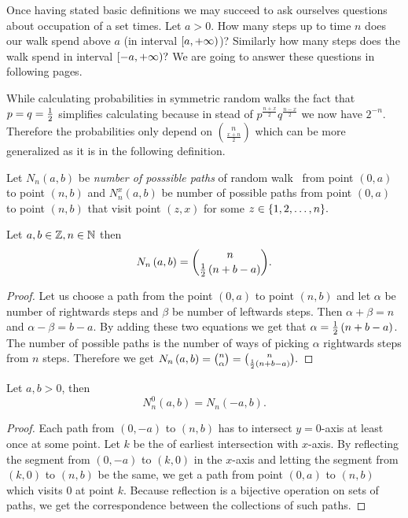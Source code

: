 \begin{rem}
  Once having stated basic definitions we may succeed to ask ourselves questions about occupation of a set times. Let $a>0$. How many steps up to time $n$ does our walk spend above $a$ (in interval $[a,{+\infty})$)? Similarly how many steps does the walk spend in interval $[-a,{+\infty})?$ We are going to answer these questions in following pages.
\end{rem}

\begin{rem}
 While calculating probabilities in symmetric random walks the fact that $p=q=\frac{1}{2}$ simplifies calculating because in stead of $p^{\frac{n+x}{2}}q^{\frac{n-x}{2}}$ we now have $2^{-n}.$ Therefore the probabilities only depend on $\binom{n}{\frac{x+n}{2}}$ which can be more generalized as it is in the following definition.
\end{rem}

\begin{defn}\label{defn-number_possible_paths}
 Let $N_n \left( a,b \right) $ be \emph{number of posssible paths} of random walk \rw\ from point $ \left( 0,a \right) $ to point $ \left( n,b \right)$
 and $N_n^x \left( a,b \right) $ be number of possible paths from point $ \left( 0,a \right) $ to point $\left( n,b \right)$
 that visit point $\left(z,x\right)$ for some $z \in \{1,2,\ldots, n\}.$
\end{defn}
\begin{thm}\label{thm-number_of_possible_paths}
 Let $a,b \in \mathbb{Z}, n \in \mathbb{N}$ then
 \[
    N_n \left( a,b \right) =\binom{n}{\frac{1}{2} \left(n+b-a \right)}.
  \]
\end{thm}
\begin{proof}
 Let us choose a path from the point $ \left( 0,a \right) $ to point $ \left( n,b \right) $ and let $\alpha$ be number of rightwards steps and $\beta$ be number of leftwards steps.
 Then $\alpha+\beta=n$ and $\alpha-\beta=b-a$. By adding these two equations we get that $\alpha=\frac{1}{2} \left( n+b-a \right) $.
 The number of possible paths is the number of ways of picking $\alpha$ rightwards steps from $n$ steps.
 Therefore we get $N_n \left( a,b \right) =\binom{n}{\alpha}=\binom{n}{\frac{1}{2} \left( n+b-a \right) }.$
\end{proof}

\begin{thm}\label{thm-reflection_principle}
 Let $a,b >0$, then
 \[
    N_n^0 \left( a,b \right) =N_n \left( -a,b \right).
  \]
\end{thm}
\begin{proof}
 Each path from $ \left( 0,-a \right) $ to $ \left( n,b \right) $ has to intersect $y=0$-axis at least once at some point.
 Let $k$ be the \Time of earliest intersection with $x$-axis. By reflecting the segment from $\left( 0,-a \right)$ to $\left( k,0 \right)$ in the $x$-axis and letting the segment from $\left(k,0\right)$ to $\left(n,b\right)$ be the same,
 we get a path from point $\left( 0,a \right)$ to $ \left(n,b\right)$ which visits $0$ at point $k$.
 Because reflection is a bijective operation on sets of paths, we get the correspondence between the collections of such paths.
\end{proof}

